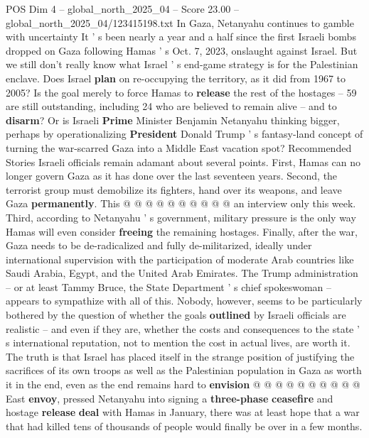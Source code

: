 \begin{textsample}{POS Dim 4 – global\_north\_2025\_04 – Score 23.00 – global\_north\_2025\_04/123415198.txt}  \label{ex:f4_pos_225}
In Gaza, Netanyahu continues to gamble with uncertainty It ' s been nearly a year and a half since the first Israeli bombs dropped on Gaza following Hamas ' s Oct. 7, 2023, onslaught against Israel.
But we still don't really know what Israel ' s end-game strategy is for the Palestinian enclave.
Does Israel \textbf{plan} on re-occupying the territory, as it did from 1967 to 2005?
Is the goal merely to force Hamas to \textbf{release} the rest of the hostages -- 59 are still outstanding, including 24 who are believed to remain alive -- and to \textbf{disarm}?
Or is Israeli \textbf{Prime} Minister Benjamin Netanyahu thinking bigger, perhaps by operationalizing \textbf{President} Donald Trump ' s fantasy-land concept of turning the war-scarred Gaza into a Middle East vacation spot?
Recommended Stories Israeli officials remain adamant about several points.
First, Hamas can no longer govern Gaza as it has done over the last seventeen years.
Second, the terrorist group must demobilize its fighters, hand over its weapons, and leave Gaza \textbf{permanently}.
This @ @ @ @ @ @ @ @ @ @ an interview only this week.
Third, according to Netanyahu ' s government, military pressure is the only way Hamas will even consider \textbf{freeing} the remaining hostages.
Finally, after the war, Gaza needs to be de-radicalized and fully de-militarized, ideally under international supervision with the participation of moderate Arab countries like Saudi Arabia, Egypt, and the United Arab Emirates.
The Trump administration -- or at least Tammy Bruce, the State Department ' s chief spokeswoman -- appears to sympathize with all of this.
Nobody, however, seems to be particularly bothered by the question of whether the goals \textbf{outlined} by Israeli officials are realistic -- and even if they are, whether the costs and consequences to the state ' s international reputation, not to mention the cost in actual lives, are worth it.
The truth is that Israel has placed itself in the strange position of justifying the sacrifices of its own troops as well as the Palestinian population in Gaza as worth it in the end, even as the end remains hard to \textbf{envision} @ @ @ @ @ @ @ @ @ @ East \textbf{envoy}, pressed Netanyahu into signing a \textbf{three-phase} \textbf{ceasefire} and hostage \textbf{release} \textbf{deal} with Hamas in January, there was at least hope that a war that had killed tens of thousands of people would finally be over in a few months.

\end{textsample}
